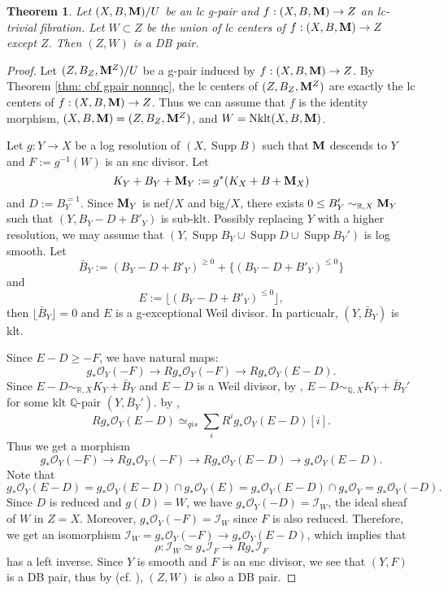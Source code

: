 \documentclass[11pt]{amsart}
\numberwithin{equation}{section}
\newcommand{\Mm}{{\bf{M}}}
\newcommand{\Qq}{\mathbb{Q}}
\newcommand{\Rr}{\mathbb{R}}
\newcommand{\Nklt}{\operatorname{Nklt}}
\newcommand{\Supp}{\operatorname{Supp}}
\newcommand{\lf}{\lfloor}
\newcommand{\rf}{\rfloor}
\newcommand{\Oo}{\mathcal{O}}
\newtheorem{thm}{Theorem}[subsection]
\theoremstyle{definition}
\theoremstyle{definition}
\theoremstyle{definition}
\begin{document}
\begin{thm}\label{thm: (Z,W) is DB for glc crepant log structure}
Let $(X,B,\Mm)/U$ be an lc g-pair and $f: (X,B,\Mm)\rightarrow Z$ an lc-trivial fibration.
Let $W\subset Z$ be the union of lc centers of $f: (X,B,\Mm)\rightarrow Z$ except $Z$. Then $(Z,W)$ is a DB pair.
\end{thm}

\begin{proof}
Let $(Z,B_Z,\Mm^Z)/U$ be a g-pair induced by $f: (X,B,\Mm)\rightarrow Z$. By Theorem \ref{thm: cbf gpair nonnqc}, the lc centers of $(Z,B_Z,\Mm^Z)$ are exactly the lc centers of $f: (X,B,\Mm)\rightarrow Z$. Thus we can assume that $f$ is the identity morphism, $(X,B,\Mm)=(Z,B_Z,\Mm^Z)$, and $W=\Nklt(X,B,\Mm)$.

Let $g: Y\to X$ be a log resolution of $(X,\Supp B)$ such that $\Mm$ descends to $Y$ and $F:=g^{-1}(W)$ is an snc divisor. Let
$$K_Y+B_Y+\Mm_Y:=g^*(K_X+B+\Mm_X)$$
and $D:=B_Y^{=1}$. Since $\Mm_Y$ is nef$/X$ and big$/X$, there exists $0\le B'_Y\sim_{\Rr,X}\Mm_Y$ such that $(Y,B_Y-D+B'_Y)$ is sub-klt. Possibly replacing $Y$ with a higher resolution, we may assume that $(Y,\Supp B_Y\cup\Supp D\cup\Supp B_Y')$ is log smooth. Let 
$$\bar B_Y:=(B_Y-D+B'_Y)^{\ge0}+\{(B_Y-D+B'_Y)^{\le 0}\}$$ and 
$$E:=\lfloor (B_Y-D+B'_Y)^{\le 0}\rfloor,$$ then $\lf\bar B_Y\rf=0$ and $E$ is a g-exceptional Weil divisor. In particualr, $(Y,\bar B_Y)$ is klt.

Since $E-D\ge-F$, we have natural maps:
$$
g_*\Oo_Y(-F)\to Rg_*\Oo_Y(-F)\to Rg_*\Oo_Y(E-D).
$$
Since $E-D\sim_{\Rr,X}K_Y+\bar B_Y$ and $E-D$ is a Weil divisor, by \cite[Lemma 5.3, Theorem 5.6]{HLS19}, $E-D\sim_{\Qq,X}K_Y+\bar B_Y'$ for some klt $\Qq$-pair $(Y,\bar B_Y')$. by \cite[Theorem 10.41]{Kol13},
$$
Rg_*\Oo_Y(E-D)\simeq_{qis}\sum_{i}R^ig_*\Oo_Y(E-D)[i].
$$
Thus we get a morphism 
$$
g_*\Oo_Y(-F)\to Rg_*\Oo_Y(-F)\to Rg_*\Oo_Y(E-D)\to g_*\Oo_Y(E-D).
$$
Note that 
$$
g_*\Oo_Y(E-D)=g_*\Oo_Y(E-D)\cap g_*\Oo_Y(E)=g_*\Oo_Y(E-D)\cap g_*\Oo_Y=g_*\Oo_Y(-D).
$$
Since $D$ is reduced and $g(D)=W$, we have $g_*\Oo_Y(-D)=\mathcal{I}_W$, the ideal sheaf of $W$ in $Z=X$. Moreover, $g_*\Oo_Y(-F)=\mathcal{I}_W$ since $F$ is also reduced. Therefore, we get an isomorphism $\mathcal{I}_W=g_*\Oo_Y(-F)\to g_*\Oo_Y(E-D)$, which implies that 
$$
\rho: \mathcal{I}_W\simeq g_*\mathcal{I}_F\to Rg_*\mathcal{I}_F
$$
has a left inverse. Since $Y$ is smooth and $F$ is an snc divisor, we see that $(Y,F)$ is a DB pair, thus by \cite[Theorem 3.3]{Kov12} (cf. \cite[Theorem 6.27]{Kol13}), $(Z,W)$ is also a DB pair. \end{proof}
\end{document}
